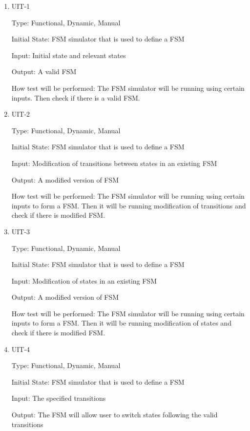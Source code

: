 \documentclass[12pt, titlepage]{article}
\begin{document}
\begin{enumerate}

\item{UIT-1\\}

Type: Functional, Dynamic, Manual
					
Initial State: FSM simulator that is used to define a FSM
					
Input: Initial state and relevant states
					
Output: A valid FSM
					
How test will be performed: The FSM simulator will be running using certain inputs. Then check if there is 
a valid FSM.
					
\item{UIT-2\\}

Type: Functional, Dynamic, Manual
					
Initial State: FSM simulator that is used to define a FSM
					
Input: Modification of transitions between states in an existing FSM
					
Output: A modified version of FSM
					
How test will be performed: The FSM simulator will be running using certain inputs to form a FSM. Then it will be 
running modification of transitions and check if there is modified FSM.

\item{UIT-3\\}

Type: Functional, Dynamic, Manual
					
Initial State: FSM simulator that is used to define a FSM
					
Input: Modification of states in an existing FSM

Output: A modified version of FSM
					
How test will be performed: The FSM simulator will be running using certain inputs to form a FSM. Then it will be 
running modification of states and check if there is modified FSM.

\item{UIT-4\\}

Type: Functional, Dynamic, Manual
					
Initial State: FSM simulator that is used to define a FSM
					
Input: The specified transitions
					
Output: The FSM will allow user to switch states following the valid transitions
					

\end{enumerate}
\end{document}
